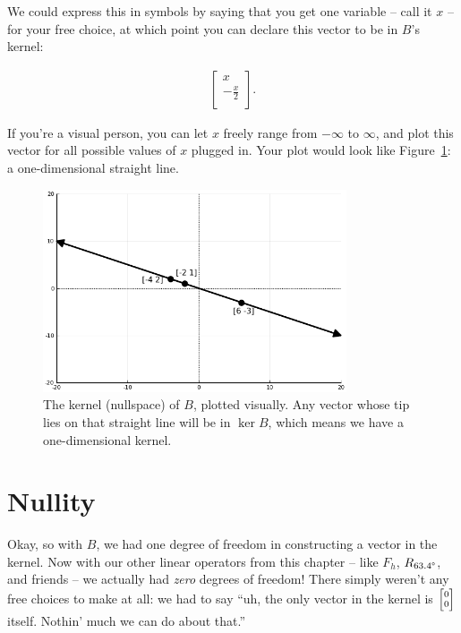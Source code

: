 We could express this in symbols by saying that you get one variable -- call it
$x$ -- for your free choice, at which point you can declare this vector to be
in $B$'s kernel:

\vspace{-.15in}
\begin{align*}
\begin{bmatrix}
x \\ -\frac{x}{2} \\
\end{bmatrix}.
\end{align*}
\vspace{-.15in}

If you're a visual person, you can let $x$ freely range from $-\infty$ to
$\infty$, and plot this vector for all possible values of $x$ plugged in. Your
plot would look like Figure~\ref{fig:nullspace1}: a one-dimensional straight
line.

\begin{figure}[ht]
\centering
\includegraphics[width=0.8\textwidth]{nullspace1.png}
\caption[.]{The kernel (nullspace) of $B$, plotted visually. Any vector whose
tip lies on that straight line will be in $\ker B$, which means we have a
one-dimensional kernel.}
\label{fig:nullspace1}
\end{figure}

\section{Nullity}

Okay, so with $B$, we had one degree of freedom in constructing a vector in the
kernel. Now with our other linear operators from this chapter -- like $F_{h}$,
$R_{63.4\degree}$, and friends -- we actually had \textit{zero} degrees of
freedom! There simply weren't any free choices to make at all: we had to say
``uh, the only vector in the kernel is ${\scriptsize \begin{bmatrix} 0 \\ 0
\end{bmatrix}}$ itself. Nothin' much we can do about that.''

